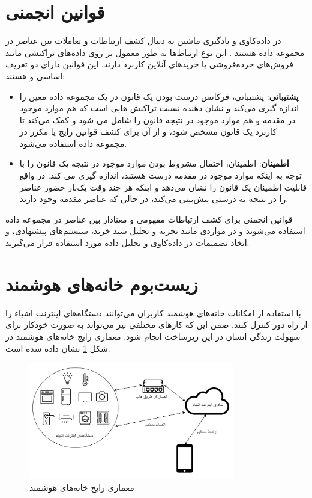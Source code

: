 \section{قوانین انجمنی‌}\label{chapter:c24}

 در داده‌کاوی و یادگیری ماشین به دنبال کشف ارتباطات و تعاملات بین عناصر در مجموعه داده هستند \cite{x241}. این نوع ارتباط‌ها به طور معمول بر روی داده‌های تراکنشی مانند فروش‌های خرده‌فروشی یا خرید‌های آنلاین کاربرد دارند. این قوانین دارای دو تعریف اساسی  و  هستند:

\begin{itemize}
\item \textbf{پشتیبانی}: پشتیبانی، فرکانس درست بودن یک قانون در یک مجموعه داده معین را اندازه گیری می‌کند و نشان دهنده نسبت تراکنش هایی است که هم موارد موجود در مقدمه و هم موارد موجود در نتیجه قانون را شامل می شود و کمک می‌کند تا کاربرد یک قانون مشخص شود، و از آن برای کشف قوانین رایج یا مکرر در مجموعه داده استفاده می‌شود. 
\item \textbf{اطمینان}: اطمینان، احتمال مشروط بودن موارد موجود در نتیجه یک قانون را با توجه به اینکه موارد موجود در مقدمه درست هستند، اندازه گیری می کند. در واقع قابلیت اطمینان یک قانون را نشان می‌دهد و اینکه هر چند وقت یک‌بار حضور عناصر را در نتیجه به درستی پیش‌بینی می‌کند، در حالی که عناصر مقدمه وجود دارند.
\end{itemize}

قوانین انجمنی برای کشف ارتباطات مفهومی و معنادار بین عناصر در مجموعه داده استفاده می‌شوند و در مواردی مانند تجزیه و تحلیل سبد خرید، سیستم‌های پیشنهادی، و اتخاذ تصمیمات در داده‌کاوی و تحلیل داده مورد استفاده قرار می‌گیرند.

\section{زیست‌بوم خانه‌های هوشمند‌}

با استفاده از امکانات خانه‌های هوشمند کاربران می‌توانند دستگاه‌های اینترنت اشیاء را از راه دور کنترل کنند. ضمن این که کارهای مختلفی نیز می‌تواند به صورت خودکار برای سهولت زندگی انسان در این زیرساخت انجام شود. معماری رایج خانه‌های هوشمند در شکل \ref{fig:f21} نشان داده شده است.

\begin{figure}[htp]
\centerline{\includegraphics[width=0.8\textwidth]{figs/f21.png}}
\caption[معماری رایج خانه‌های هوشمند]{معماری رایج خانه‌های هوشمند \cite{x251}}
\label{fig:f21}
\end{figure}

